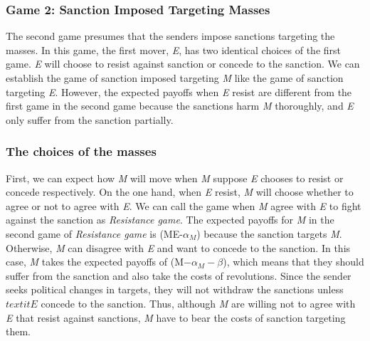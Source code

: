 \documentclass[11pt]{article}
\begin{document}
	
\subsubsection*{Game 2: Sanction Imposed Targeting Masses}
\begin{center}
	
\end{center}

The second game presumes that the senders impose sanctions targeting the masses. In this game, the first mover, \textit{E}, has two identical choices of the first game. \textit{E} will choose to resist against sanction or concede to the sanction. We can establish the game of sanction imposed targeting \textit{M} like the game of sanction targeting \textit{E}. However, the expected payoffs when \textit{E} resist are different from the first game in the second game because the sanctions harm \textit{M} thoroughly, and \textit{E} only suffer from the sanction partially.
		
\subsubsection*{The choices of the masses}
	
First, we can expect how \textit{M} will move when \textit{M} suppose \textit{E} chooses to resist or concede respectively. On the one hand, when \textit{E} resist, \textit{M} will choose whether to agree or not to agree with \textit{E}. We can call the game when \textit{M} agree with \textit{E} to fight against the sanction as \textit{Resistance game}. The expected payoffs for \textit{M} in the second game of \textit{Resistance game} is (ME-$\alpha_{M}$) because the sanction targets \textit{M}. Otherwise, \textit{M} can disagree with \textit{E} and want to concede to the sanction. In this case, \textit{M} takes the expected payoffs of (M$-\alpha_{M}-\beta$), which means that they should suffer from the sanction and also take the costs of revolutions. Since the sender seeks political changes in targets, they will not withdraw the sanctions unless $textit{E}$ concede to the sanction. Thus, although \textit{M} are willing not to agree with \textit{E} that resist against sanctions, \textit{M} have to bear the costs of sanction targeting them.
	
\end{document}
